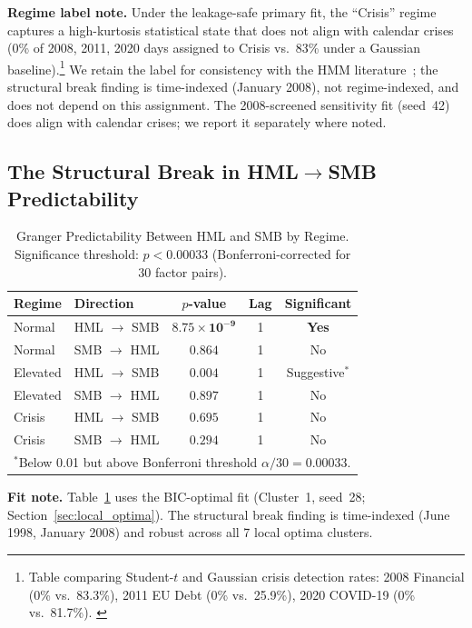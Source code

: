 \documentclass[sigconf,anonymous]{acmart}
\begin{document}
\label{sec:gaussian_comparison}
\textbf{Regime label note.} Under the leakage-safe primary fit, the ``Crisis''
regime captures a high-kurtosis statistical state that does not align with
calendar crises (0\% of 2008, 2011, 2020 days assigned to Crisis vs.\ 83\%
under a Gaussian baseline).\footnote{Table comparing Student-$t$ and Gaussian
crisis detection rates: 2008 Financial (0\% vs.\ 83.3\%), 2011 EU Debt
(0\% vs.\ 25.9\%), 2020 COVID-19 (0\% vs.\ 81.7\%). \label{tab:detection}}
We retain the label for consistency with the HMM
literature~\cite{bulla2011hidden}; the structural break finding is time-indexed
(January 2008), not regime-indexed, and does not depend on this assignment.
The 2008-screened sensitivity fit (seed~42) does align with calendar crises;
we report it separately where noted.

\subsection{The Structural Break in HML$\to$SMB Predictability}
\label{sec:main_result}

\begin{table}[t]
\centering
\caption{Granger Predictability Between HML and SMB by Regime. Significance threshold:
$p < 0.00033$ (Bonferroni-corrected for 30 factor pairs).}
\label{tab:main}
\small
\begin{tabular}{llccc}
\toprule
Regime & Direction & $p$-value & Lag & Significant \\
\midrule
Normal & HML $\to$ SMB & $\mathbf{8.75 \times 10^{-9}}$ & 1 & \textbf{Yes} \\
Normal & SMB $\to$ HML & $0.864$ & 1 & No \\
\midrule
Elevated & HML $\to$ SMB & $0.004$ & 1 & Suggestive$^*$ \\
Elevated & SMB $\to$ HML & $0.897$ & 1 & No \\
\midrule
Crisis & HML $\to$ SMB & $0.695$ & 1 & No \\
Crisis & SMB $\to$ HML & $0.294$ & 1 & No \\
\bottomrule
\multicolumn{5}{l}{\footnotesize $^*$Below 0.01 but above Bonferroni threshold $\alpha/30 = 0.00033$.}
\end{tabular}
\end{table}

\textbf{Fit note.} Table~\ref{tab:main} uses the BIC-optimal fit (Cluster~1, seed~28; Section~\ref{sec:local_optima}). The structural break finding is time-indexed (June 1998, January 2008) and robust across all 7 local optima clusters.
\end{document}
